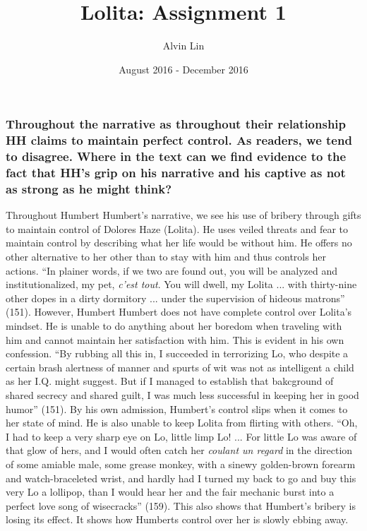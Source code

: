 \documentclass{article}
\title{Lolita: Assignment 1}
\author{Alvin Lin}
\date{August 2016 - December 2016}
\begin{document}
\maketitle

\subsubsection*{Throughout the narrative as throughout their relationship HH
claims to maintain perfect control. As readers, we tend to disagree. Where in
the text can we find evidence to the fact that HH’s grip on his narrative and
his captive as not as strong as he might think?}

Throughout Humbert Humbert's narrative, we see his use of bribery through gifts
to maintain control of Dolores Haze (Lolita). He uses veiled threats and fear to
maintain control by describing what her life would be without him. He offers no
other alternative to her other than to stay with him and thus controls her
actions. ``In plainer words, if we two are found out, you will be analyzed and
institutionalized, my pet, \textit{c'est tout}. You will dwell, my Lolita ...
with thirty-nine other dopes in a dirty dormitory ... under the supervision of
hideous matrons'' (151). However, Humbert Humbert does not have complete control
over Lolita's mindset. He is unable to do anything about her boredom when
traveling with him and cannot maintain her satisfaction with him. This is
evident in his own confession. ``By rubbing all this in, I succeeded in
terrorizing Lo, who despite a certain brash alertness of manner and spurts of
wit was not as intelligent a child as her I.Q. might suggest. But if I managed
to establish that bakcground of shared secrecy and shared guilt, I was much
less successful in keeping her in good humor'' (151). By his own admission,
Humbert's control slips when it comes to her state of mind. He is also unable
to keep Lolita from flirting with others. ``Oh, I had to keep a very sharp eye
on Lo, little limp Lo! ... For little Lo was aware of that glow of hers, and I
would often catch her \textit{coulant un regard} in the direction of some
amiable male, some grease monkey, with a sinewy golden-brown forearm and
watch-braceleted wrist, and hardly had I turned my back to go and buy this very
Lo a lollipop, than I would hear her and the fair mechanic burst into a perfect
love song of wisecracks'' (159). This also shows that Humbert's bribery is
losing its effect. It shows how Humberts control over her is slowly ebbing away.
\end{document}
